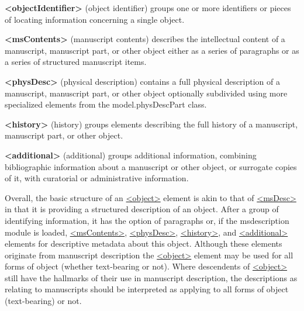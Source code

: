 \begin{sansreflist}
  
\item [\textbf{<objectIdentifier>}] (object identifier) groups one or more identifiers or pieces of locating information concerning a single object.
\item [\textbf{<msContents>}] (manuscript contents) describes the intellectual content of a manuscript, manuscript part, or other object either as a series of paragraphs or as a series of structured manuscript items.
\item [\textbf{<physDesc>}] (physical description) contains a full physical description of a manuscript, manuscript part, or other object optionally subdivided using more specialized elements from the \textsf{model.physDescPart} class.
\item [\textbf{<history>}] (history) groups elements describing the full history of a manuscript, manuscript part, or other object.
\item [\textbf{<additional>}] (additional) groups additional information, combining bibliographic information about a manuscript or other object, or surrogate copies of it, with curatorial or administrative information.
\end{sansreflist}
 Overall, the basic structure of an \hyperref[TEI.object]{<object>} element is akin to that of \hyperref[TEI.msDesc]{<msDesc>} in that it is providing a structured description of an object. After a group of identifying information, it has the option of paragraphs or, if the \textsf{msdescription} module is loaded, \hyperref[TEI.msContents]{<msContents>}, \hyperref[TEI.physDesc]{<physDesc>}, \hyperref[TEI.history]{<history>}, and \hyperref[TEI.additional]{<additional>} elements for descriptive metadata about this object. Although these elements originate from manuscript description the \hyperref[TEI.object]{<object>} element may be used for all forms of object (whether text-bearing or not).  Where descendents of \hyperref[TEI.object]{<object>} still have the hallmarks of their use in manuscript description, the descriptions as relating to manuscripts should be interpreted as applying to all forms of object (text-bearing) or not.\par
